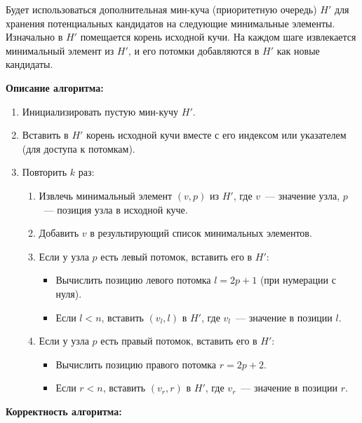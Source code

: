 \documentclass[11pt]{article}
\begin{document}
\begin{solution}
    Будет использоваться дополнительная мин-куча (приоритетную очередь) $H'$ для хранения потенциальных кандидатов на следующие минимальные элементы. Изначально в $H'$ помещается корень исходной кучи. На каждом шаге извлекается минимальный элемент из $H'$, и его потомки добавляются в $H'$ как новые кандидаты.

    \textbf{Описание алгоритма:}

    \begin{enumerate}
        \item Инициализировать пустую мин-кучу $H'$.
        \item Вставить в $H'$ корень исходной кучи вместе с его индексом или указателем (для доступа к потомкам).
        \item Повторить $k$ раз:
              \begin{enumerate}
                  \item Извлечь минимальный элемент $(v, p)$ из $H'$, где $v$~--- значение узла, $p$~--- позиция узла в исходной куче.
                  \item Добавить $v$ в результирующий список минимальных элементов.
                  \item Если у узла $p$ есть левый потомок, вставить его в $H'$:
                        \begin{itemize}
                            \item Вычислить позицию левого потомка $l = 2p + 1$ (при нумерации с нуля).
                            \item Если $l < n$, вставить $(v_l, l)$ в $H'$, где $v_l$~--- значение в позиции $l$.
                        \end{itemize}
                  \item Если у узла $p$ есть правый потомок, вставить его в $H'$:
                        \begin{itemize}
                            \item Вычислить позицию правого потомка $r = 2p + 2$.
                            \item Если $r < n$, вставить $(v_r, r)$ в $H'$, где $v_r$~--- значение в позиции $r$.
                        \end{itemize}
              \end{enumerate}
    \end{enumerate}

    \textbf{Корректность алгоритма:}


\end{solution}
\end{document}
